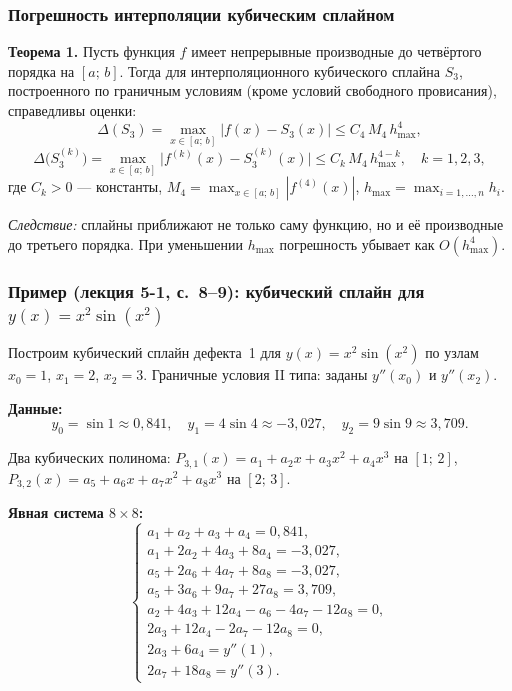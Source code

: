 \subsubsection*{Погрешность интерполяции кубическим сплайном}

\textbf{Теорема 1.} Пусть функция $f$ имеет непрерывные производные до четвёртого порядка на $[a;\,b]$. Тогда для интерполяционного кубического сплайна $S_3$, построенного по граничным условиям (кроме условий свободного провисания), справедливы оценки:
\[
    \Delta(S_3) = \max_{x \in [a;\,b]} |f(x) - S_3(x)| \leq C_4\, M_4\, h_{\max}^4,
\]
\[
    \Delta\bigl(S_3^{(k)}\bigr) = \max_{x \in [a;\,b]} \bigl|f^{(k)}(x) - S_3^{(k)}(x)\bigr| \leq C_k\, M_4\, h_{\max}^{4-k}, \quad k = 1, 2, 3,
\]
где $C_k > 0$ --- константы, $M_4 = \max_{x \in [a;\,b]} |f^{(4)}(x)|$, $h_{\max} = \max_{i=1,\ldots,n} h_i$.

\textit{Следствие:} сплайны приближают не только саму функцию, но и её производные до третьего порядка. При уменьшении $h_{\max}$ погрешность убывает как $O(h_{\max}^4)$.


\subsubsection*{Пример (лекция 5-1, с.~8--9): кубический сплайн для $y(x) = x^2 \sin(x^2)$}

Построим кубический сплайн дефекта~1 для $y(x) = x^2 \sin(x^2)$ по узлам $x_0 = 1$, $x_1 = 2$, $x_2 = 3$. Граничные условия II типа: заданы $y''(x_0)$ и $y''(x_2)$.

\textbf{Данные:}
\[
    y_0 = \sin 1 \approx 0{,}841, \quad y_1 = 4 \sin 4 \approx -3{,}027, \quad y_2 = 9 \sin 9 \approx 3{,}709.
\]

Два кубических полинома: $P_{3,1}(x) = a_1 + a_2 x + a_3 x^2 + a_4 x^3$ на $[1;\, 2]$, $P_{3,2}(x) = a_5 + a_6 x + a_7 x^2 + a_8 x^3$ на $[2;\, 3]$.

\textbf{Явная система $8 \times 8$:}
\[
    \begin{cases}
        a_1 + a_2 + a_3 + a_4 = 0{,}841, \\
        a_1 + 2a_2 + 4a_3 + 8a_4 = -3{,}027, \\
        a_5 + 2a_6 + 4a_7 + 8a_8 = -3{,}027, \\
        a_5 + 3a_6 + 9a_7 + 27a_8 = 3{,}709, \\
        a_2 + 4a_3 + 12a_4 - a_6 - 4a_7 - 12a_8 = 0, \\
        2a_3 + 12a_4 - 2a_7 - 12a_8 = 0, \\
        2a_3 + 6a_4 = y''(1), \\
        2a_7 + 18a_8 = y''(3).
    \end{cases}
\]

